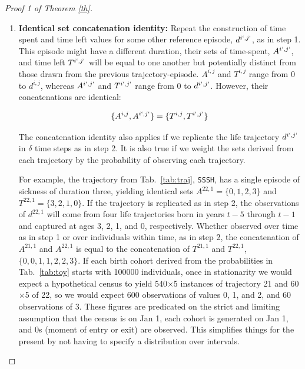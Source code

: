 \documentclass[12pt,oneside,a4paper]{article}
\theoremstyle{definition}
\newcommand{\vb}[1]{\texttt{#1}}
\begin{document}
\begin{proof}[Proof 1 of Theorem \ref{th}]
\begin{enumerate}
Formally, sets $A^{i,j}$ and $T^{i,j}$ consist of the same values as the previous, but
coming from distinct instances of life trajectories generated in a uniform series from between $t-a_R^{i,j}$ years
ago until as recently as $t-a_L^{i,j}$ years ago. This demonstrates both
period-cohort set equality and time spent-left set equality. The blue and red triangles in
Figure~\ref{fig:clones} are simple rotations of one another.

Continuing with the episode $d^{21,1}$ in Tab.~\ref{tab:traj}, if we replicate this trajectory in single year steps, and take a census in year $t$, the values of $A^{21,1}$ and $T^{21,1}$ are the same as before $\{0,1,2\}$, but taken from three different life trajectories that began in years $t-4$, $t-3$, and $t-2$, and were observed at ages 3, 2, and 1, respectively.

\FloatBarrier
\item{\textbf{Identical set concatenation identity:}} Repeat the construction of time spent and time left values for some other reference episode, $d^{i`,j`}$, as in step 1. This episode might have a different duration, their
sets of time-spent, $A^{i`,j`}$, and time left $T^{i`,j`}$ will be equal to one another but potentially distinct from those drawn from the previous trajectory-episode. $A^{i,j}$ and $T^{i,j}$ range from 0 to $d^{i,j}$, whereas $A^{i`,j`}$ and $T^{i`,j`}$
range from 0 to $d^{i`,j`}$. However, their concatenations are identical:

\begin{equation}
\label{eq:unioneq}
\{A^{i,j} , A^{i`,j`}\} = \{T^{i,j} , T^{i`,j`}\}
\end{equation}

The concatenation identity also applies if we replicate the life trajectory $d^{i`,j`}$ in $\delta$ time steps as in step 2. It is also true if we weight the sets derived from each trajectory by the probability of observing each trajectory.

For example, the  trajectory from Tab.~\ref{tab:traj}, \vb{SSSH}, has a single episode of sickness of duration three, yielding identical sets $A^{22,1} = \{0,1,2,3 \}$ and $T^{22,1} = \{3,2,1,0 \}$. If the trajectory is replicated as in step 2, the observations of $d^{22,1}$ will come from four life trajectories born in years $t-5$ through $t-1$ and captured at ages 3, 2, 1, and 0, respectively. Whether observed over time as in step 1 or over individuals within time, as in step 2, the concatenation of $A^{21,1}$ and $A^{22,1}$ is equal to the concatenation of $T^{21,1}$ and $T^{22,1}$, $\{0,0,1,1,2,2,3 \}$. If each birth cohort derived from the probabilities in Tab.~\ref{tab:toy} starts with 100000 individuals, once in stationarity we would expect a hypothetical census to yield 540$\times$5 instances of trajectory 21 and 60$\times$5 of 22, so we would expect 600 observations of values 0, 1, and 2, and 60 observations of 3. These figures are predicated on the strict and limiting assumption that the census is on Jan 1, each cohort is generated on Jan 1, and 0s (moment of entry or exit) are observed. This simplifies things for the present by not having to specify a distribution over intervals.


\end{enumerate}
\end{proof}
\end{document}
